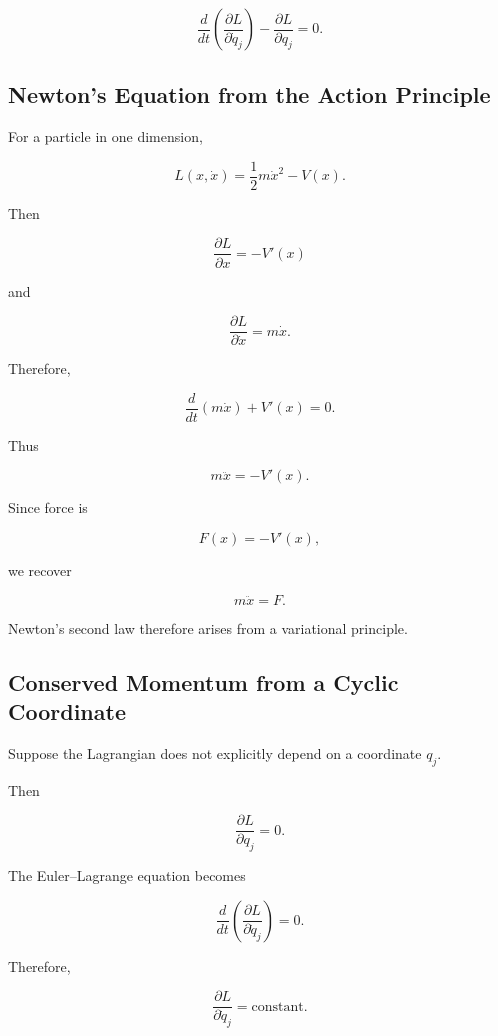 \[
\boxed{
\frac{d}{dt}
\left(
\frac{\partial L}{\partial\dot q_j}
\right)
-
\frac{\partial L}{\partial q_j}
=
0.
}
\]

\subsection{Newton's Equation from the Action Principle}
\label{subsec:newton-from-action}

For a particle in one dimension,

\[
L(x,\dot x)
=
\frac12m\dot x^2-V(x).
\]

Then

\[
\frac{\partial L}{\partial x}
=
-V'(x)
\]

and

\[
\frac{\partial L}{\partial\dot x}
=
m\dot x.
\]

Therefore,

\[
\frac{d}{dt}
\left(
m\dot x
\right)
+
V'(x)
=
0.
\]

Thus

\[
\boxed{
m\ddot x
=
-V'(x).
}
\]

Since force is

\[
F(x)=-V'(x),
\]

we recover

\[
\boxed{
m\ddot x=F.
}
\]

Newton's second law therefore arises from a variational principle.

\subsection{Conserved Momentum from a Cyclic Coordinate}
\label{subsec:cyclic-coordinate}

Suppose the Lagrangian does not explicitly depend on a coordinate
\(q_j\).

Then

\[
\frac{\partial L}{\partial q_j}=0.
\]

The Euler--Lagrange equation becomes

\[
\frac{d}{dt}
\left(
\frac{\partial L}{\partial\dot q_j}
\right)
=
0.
\]

Therefore,

\[
\boxed{
\frac{\partial L}{\partial\dot q_j}
=
\text{constant}.
}
\]

